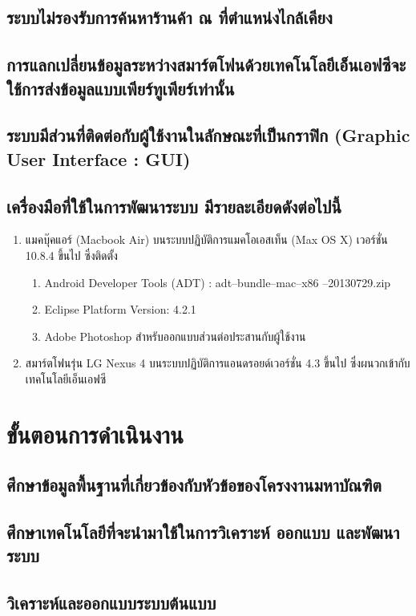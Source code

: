 \documentclass[12pt,a4paper]{article}
\begin{document}
\subsection{ระบบไม่รองรับการค้นหาร้านค้า ณ ที่ตำแหน่งไกล้เคียง}
\subsection{การแลกเปลี่ยนข้อมูลระหว่างสมาร์ตโฟนด้วยเทคโนโลยีเอ็นเอฟซีจะใช้การส่งข้อมูลแบบเพียร์ทูเพียร์เท่านั้น}
\subsection{ระบบมีส่วนที่ติดต่อกับผู้ใช้งานในลักษณะที่เป็นกราฟิก (Graphic User Interface : GUI)}
\subsection{เครื่องมือที่ใช้ในการพัฒนาระบบ มีรายละเอียดดังต่อไปนี้}
\begin{enumerate}
	\item แมคบุ๊คแอร์ (Macbook Air) บนระบบปฏิบัติการแมคโอเอสเท็น (Max OS X) เวอร์ชั่น 10.8.4 ขึ้นไป ซึ่งติดตั้ง
	\begin{enumerate}
		\item Android Developer Tools (ADT) : adt--bundle--mac--x86 --20130729.zip
		\item Eclipse Platform Version: 4.2.1
		\item Adobe Photoshop สำหรับออกแบบส่วนต่อประสานกับผู้ใช้งาน
	\end{enumerate}
  	\item สมาร์ตโฟนรุ่น LG Nexus 4 บนระบบปฏิบัติการแอนดรอยด์เวอร์ชั่น 4.3 ขึ้นไป ซึ่งผนวกเข้ากับเทคโนโลยีเอ็นเอฟซี
\end{enumerate}

\section{ขั้นตอนการดำเนินงาน}
\subsection{ศึกษาข้อมูลพื้นฐานที่เกี่ยวข้องกับหัวข้อของโครงงานมหาบัณฑิต}
\subsection{ศึกษาเทคโนโลยีที่จะนํามาใช้ในการวิเคราะห์ ออกแบบ และพัฒนาระบบ}
\subsection{วิเคราะห์และออกแบบระบบต้นแบบ}
\end{document}
